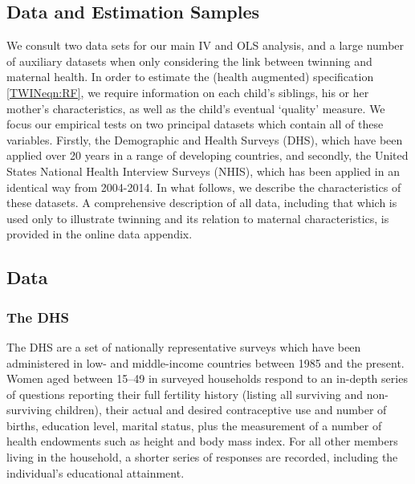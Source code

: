 \documentclass[subeqn]{article}
\begin{document}
\begin{spacing}{1.4}
\section{Data and Estimation Samples}              \label{TWINscn:data}
We consult two data sets for our main IV and OLS analysis, and a large number of
auxiliary datasets when only considering the link between twinning and maternal
health.  In order to estimate the (health augmented) specification 
\ref{TWINeqn:RF}, we require information on each child's siblings, his or her
mother's characteristics, as well as the child's eventual `quality' measure. 
We focus our empirical tests on two principal datasets which contain all of 
these variables.  Firstly, the Demographic and Health Surveys (DHS), which have 
been applied over 20 years in a range of developing countries, and secondly, the 
United States National Health Interview Surveys (NHIS), which has been applied 
in an identical way from 2004-2014.  In what follows, we describe the 
characteristics of these datasets.  A comprehensive description of all data, 
including that which is used only to illustrate twinning and its relation to 
maternal characteristics, is provided in the online data appendix.

\subsection{Data}                                  \label{TWINsscn:data}
\subsubsection{The DHS}
The DHS are a set of nationally representative surveys which have been 
administered in low- and middle-income countries between 1985 and the present. 
Women aged between 15--49 in surveyed households respond to an in-depth series 
of questions reporting their full fertility history (listing all surviving and 
non-surviving children), their actual and desired contraceptive use and number 
of births, education level, marital status, plus the measurement of a number of 
health endowments such as height and body mass index. For all other members 
living in the household, a shorter series of responses are recorded, including 
the individual's educational attainment.


\end{spacing}
\end{document}
